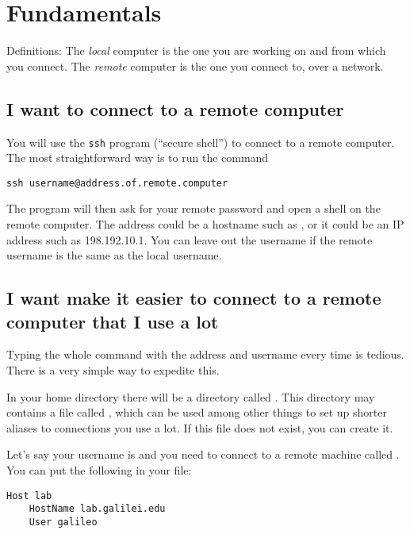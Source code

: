 \section{Fundamentals}

Definitions: The \emph{local} computer is the one you are working on and from
which you connect. The \emph{remote} computer is the one you connect to, over a
network.

\subsection{I want to connect to a remote computer}

You will use the \lstinline{ssh} program (``secure shell'') to connect to a
remote computer. The most straightforward way is to run the command

\begin{lstlisting}
ssh username@address.of.remote.computer
\end{lstlisting}

The program will then ask for your remote password and open a shell on the
remote computer. The address could be a hostname such as
, or it could be an IP address such as
198.192.10.1. You can leave out the username if the remote username is the same
as the local username.

\subsection{I want make it easier to connect to a remote computer that I use a
lot}

Typing the whole  command with the address and username every time is
tedious. There is a very simple way to expedite this.

In your home directory there will be a directory called . This
directory may contains a file called , which can be used among
other things to set up shorter aliases to connections you use a lot. If this
file does not exist, you can create it.

Let's say your username is  and you need to connect to a remote
machine called . You can put the following in your
 file:

\begin{lstlisting}
Host lab
    HostName lab.galilei.edu
    User galileo
\end{lstlisting}

